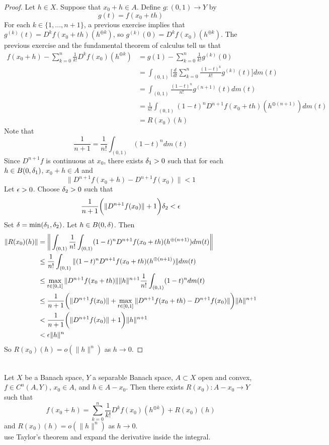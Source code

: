 \documentclass{book}
\begin{document}
	\begin{proof}
	Let $h \in X$. Suppose that $x_0 + h \in A$. Define $g: (0,1) \rightarrow Y$ by 
	$$g(t) = f(x_0 +t h)$$ 
	For each $k \in \{1, \dots, n+1\}$, a previous exercise implies that $g^{(k)}(t) = D^kf(x_0 + th)(h^{\oplus k})$, so $g^{(k)}(0) = D^kf(x_0)(h^{\oplus k})$. The previous exercise and the fundamental theorem of calculus tell us that 
	\begin{align*}
	f(x_0 +h) - \sum_{k=0}^{n} \frac{1}{k!}D^kf(x_0)(h^{\oplus k})
	&= g(1) - \sum_{k=0}^{n} \frac{1}{k!}g^{(k)}(0)\\
	&= \int_{(0,1)} \bigg [\frac{d}{dt} \sum_{k=0}^{n} \frac{(1-t)^k}{k!}g^{(k)}(t)\bigg ] dm(t) \\
	&= \int_{(0,1)} \frac{(1-t)^{n}}{n!}g^{(n+1)}(t) dm(t) \\
	&= \frac{1}{n!}\int_{(0,1)} (1-t)^{n}D^{n+1}f(x_0 + th)(h^{\oplus (n+1)})d m(t) \\
	&= R(x_0)(h)
	\end{align*}	
	Note that $$\frac{1}{n+1} = \frac{1}{n!}\int_{(0,1)} (1-t)^{n} dm(t)$$ 
	Since $D^{n+1}f$ is continuous at $x_0$, there exists $\delta_1 >0$ such that for each $h \in B(0, \delta_1)$, $x_0 + h \in A$ and 
	$$\|D^{n+1} f(x_0+h) - D^{n+1}f(x_0)\| < 1 $$  
	Let $\epsilon >0$. Choose $\delta_2 >0$ such that $$\frac{1}{n+1} \bigg( \|D^{n+1}f(x_0 )\|  +  1 \bigg) \delta_2 < \epsilon$$ Set $\delta = \min(\delta_1, \delta_2)$. Let $h \in B(0, \delta)$. Then
	\begin{align*}
	\|R(x_0)(h)\| 
	&= \bigg \| \int_{(0,1)} \frac{1}{n!}\int_{(0,1)} (1-t)^{n}D^{n+1}f(x_0 + th)(h^{\oplus (n+1)})d m(t) \bigg\| \\
	&\leq \frac{1}{n!}\int_{(0,1)} \|(1-t)^{n}D^{n+1}f(x_0 + th)(h^{\oplus (n+1)}) \|dm(t)\\
	&\leq \max_{t \in [0,1]}\|D^{n+1}f(x_0 + th)\| \|h\|^{n+1} \frac{1}{n!}\int_{(0,1)} (1-t)^{n} dm(t)  \\
	&\leq \frac{1}{n+1}  \bigg(\|D^{n+1}f(x_0 )\| +  \max_{t \in [0,1]} \|D^{n+1} f(x_0+th) - D^{n+1}f(x_0)\| \bigg)\|h\|^{n+1}  \\
	&< \frac{1}{n+1}\bigg(\|D^{n+1}f(x_0 )\|  +  1 \bigg)\|h\|^{n+1}  \\
	&<\epsilon \|h\|^n
	\end{align*}
	So $R(x_0)(h) = o(\|h\|^{n})$ as $h \rightarrow 0$.
	\end{proof}
	
	
	\begin{ex} \lex{} \\
	Let $X$ be a Banach space, $Y$ a separable Banach space, $A \subset X$ open and convex, $f\in C^{n}(A, Y)$, $x_0 \in A$, and $h \in A - x_0$. Then there exists $R(x_0): A - x_0 \rightarrow Y$ such that $$f(x_0 + h) = \sum_{k=0}^{n} \frac{1}{k!} D^k f(x_0)(h^{\oplus k}) + R(x_0)(h)$$ and $R(x_0)(h) = o(\|h\|^n)$ as $ h \rightarrow 0$. \\
	 use Taylor's theorem and expand the derivative inside the integral.
	\end{ex}
	
\end{document}
